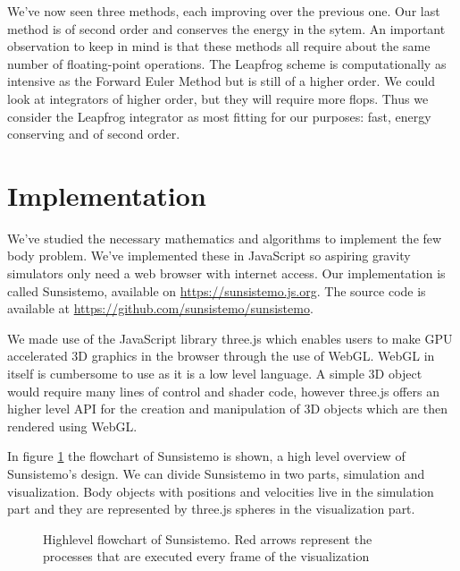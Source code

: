 \documentclass[a4paper]{article}
\begin{document}
We've now seen three methods, each improving over the previous one. Our last method is of second
order and conserves the energy in the sytem. An important observation to keep in mind is that these
methods all require about the same number of floating-point operations. The Leapfrog scheme is
computationally as intensive as the Forward Euler Method but is still of a higher order. We could
look at integrators of higher order, but they will require more flops. Thus we consider the Leapfrog
integrator as most fitting for our purposes: fast, energy conserving and of second order.

\section{Implementation}
We've studied the necessary mathematics and algorithms to implement the few body problem. We've
implemented these in JavaScript so aspiring gravity simulators only need a web browser with internet
access. Our implementation is called Sunsistemo, available on \url{https://sunsistemo.js.org}. The
source code is available at \url{https://github.com/sunsistemo/sunsistemo}.

We made use of the JavaScript library three.js which enables users to make GPU accelerated 3D
graphics in the browser through the use of WebGL. WebGL in itself is cumbersome to use as it is a
low level language. A simple 3D object would require many lines of control and shader code, however
three.js offers an higher level API for the creation and manipulation of 3D objects which are then
rendered using WebGL.

In figure \ref{fig:flowchart} the flowchart of Sunsistemo is shown, a high level overview of
Sunsistemo's design. We can divide Sunsistemo in two parts, simulation and visualization. Body
objects with positions and velocities live in the simulation part and they are represented by
three.js spheres in the visualization part.

\begin{figure}
\caption{Highlevel flowchart of Sunsistemo. Red arrows represent the processes that are executed
  every frame of the visualization}
\label{fig:flowchart}
\end{figure}
\end{document}
